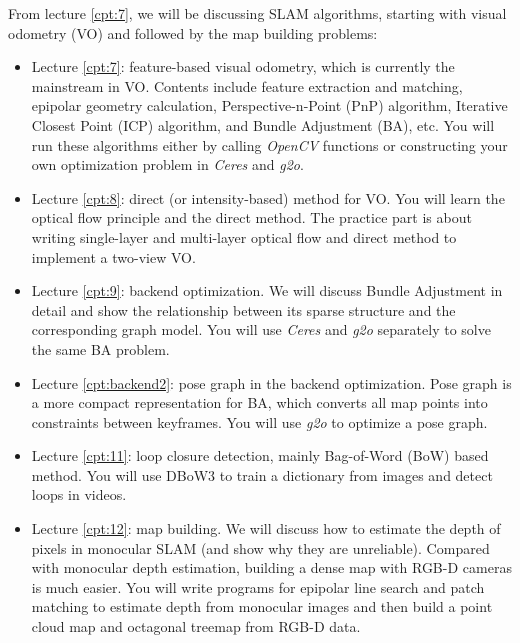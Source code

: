 \begin{English}
    From lecture \ref{cpt:7}, we will be discussing SLAM algorithms, starting with visual odometry (VO) and followed by the map building problems:
    \begin{itemize}
    	\item Lecture \ref{cpt:7}: feature-based visual odometry, which is currently the mainstream in VO. Contents include feature extraction and matching, epipolar geometry calculation, Perspective-n-Point (PnP) algorithm, Iterative Closest Point (ICP) algorithm, and Bundle Adjustment (BA), etc. You will run these algorithms either by calling \textit{OpenCV} functions or constructing your own optimization problem in \textit{Ceres} and \textit{g2o}.
    
    	\item Lecture \ref{cpt:8}: direct (or intensity-based) method for VO. You will learn the optical flow principle and the direct method. The practice part is about writing single-layer and multi-layer optical flow and direct method to implement a two-view VO.
    
    	\item Lecture \ref{cpt:9}: backend optimization. We will discuss Bundle Adjustment in detail and show the relationship between its sparse structure and the corresponding graph model. You will use \textit{Ceres} and \textit{g2o} separately to solve the same BA problem.
    
    	\item Lecture \ref{cpt:backend2}: pose graph in the backend optimization. Pose graph is a more compact representation for BA, which converts all map points into constraints between keyframes. You will use \textit{g2o} to optimize a pose graph.
    
    	\item Lecture \ref{cpt:11}: loop closure detection, mainly Bag-of-Word (BoW) based method. You will use DBoW3 to train a dictionary from images and detect loops in videos.
    
    	\item Lecture \ref{cpt:12}: map building. We will discuss how to estimate the depth of pixels in monocular SLAM  (and show why they are unreliable). Compared with monocular depth estimation, building a dense map with RGB-D cameras is much easier. You will write programs for epipolar line search and patch matching to estimate depth from monocular images and then build a point cloud map and octagonal treemap from RGB-D data.
    

\end{itemize}
\end{English}
